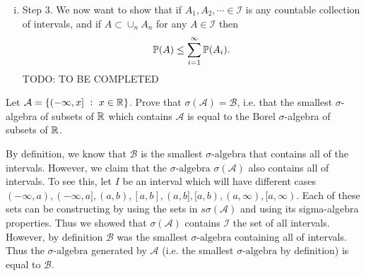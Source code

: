 \begin{solution}
\begin{enumerate}[(i)]
		\item Step 3. We now want to show that if $ A_1,A_2,\cdots \in \mathcal{I} $ is any countable collection of intervals, and if $ A \subset \cup_n A_n $ for any $ A \in \mathcal{I} $ then 
		\[ \mathbb{P}(A) \leq \sum_{i=1}^\infty\mathbb{P}(A_i).  \]
		{\color{red} \noindent TODO: TO BE COMPLETED}
	\end{enumerate}

\end{solution}


\begin{problem}
	Let $ \mathcal{A} = \set{(-\infty,x]\ :\ x\in \R} $. Prove that $ \sigma(\mathcal{A}) = \mathcal{B} $, i.e. that the smallest $ \sigma $-algebra of subsets of $ \mathbb{R} $ which contains $ \mathcal{A} $ is equal to the Borel $ \sigma $-algebra of subsets of $ \mathbb{R} $.
\end{problem}
\begin{solution}
	By definition, we know that $ \mathcal{B} $ is the smallest $ \sigma\text{-algebra} $ that contains all of the intervals. However, we claim that the $ \sigma\text{-algebra} $ $ \sigma(\mathcal{A}) $ also contains all of intervals. To see this, let $ I $ be an interval which will have different cases $(-\infty,a),(-\infty,a],(a,b),[a,b],(a,b],[a,b),(a,\infty),[a,\infty) $. Each of these sets can be constructing by using the sets in $ s \sigma(\mathcal{A}) $ and using its sigma-algebra properties. Thus we showed that $ \sigma(\mathcal{A}) $ contains $ \mathcal{I} $ the set of all intervals. However, by definition $ \mathcal{B} $ was the smallest $ \sigma\text{-algebra} $ containing all of intervals. Thus the $ \sigma\text{-algebra} $ generated by $ \mathcal{A} $ (i.e. the smallest $ \sigma\text{-algebra} $ by definition) is equal to $ \mathcal{B} $. 
\end{solution}

